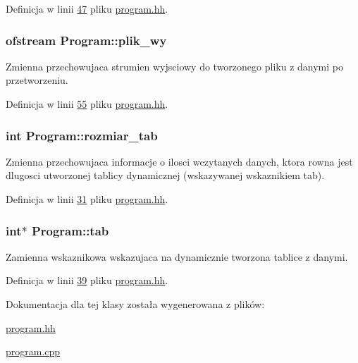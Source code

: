 Definicja w linii \hyperlink{program_8hh_source_l00047}{47} pliku \hyperlink{program_8hh_source}{program.\-hh}.

\hypertarget{class_program_a59c1761a5ea875b3d5a4678928f3a1de}{
\subsubsection[{plik\-\_\-wy}]{\setlength{\rightskip}{0pt plus 5cm}ofstream Program\-::plik\-\_\-wy\hspace{0.3cm}{\ttfamily [protected]}}}\label{class_program_a59c1761a5ea875b3d5a4678928f3a1de}
Zmienna przechowujaca strumien wyjsciowy do tworzonego pliku z danymi po przetworzeniu. 

Definicja w linii \hyperlink{program_8hh_source_l00055}{55} pliku \hyperlink{program_8hh_source}{program.\-hh}.

\hypertarget{class_program_a3b5a10104019b9daa23ce4a5f5533820}{
\subsubsection[{rozmiar\-\_\-tab}]{\setlength{\rightskip}{0pt plus 5cm}int Program\-::rozmiar\-\_\-tab\hspace{0.3cm}{\ttfamily [protected]}}}\label{class_program_a3b5a10104019b9daa23ce4a5f5533820}
Zmienna przechowujaca informacje o ilosci wczytanych danych, ktora rowna jest dlugosci utworzonej tablicy dynamicznej (wskazywanej wskaznikiem tab). 

Definicja w linii \hyperlink{program_8hh_source_l00031}{31} pliku \hyperlink{program_8hh_source}{program.\-hh}.

\hypertarget{class_program_ac72268c925315098b1632cc97d0f818a}{
\subsubsection[{tab}]{\setlength{\rightskip}{0pt plus 5cm}int$\ast$ Program\-::tab\hspace{0.3cm}{\ttfamily [protected]}}}\label{class_program_ac72268c925315098b1632cc97d0f818a}
Zamienna wskaznikowa wskazujaca na dynamicznie tworzona tablice z danymi. 

Definicja w linii \hyperlink{program_8hh_source_l00039}{39} pliku \hyperlink{program_8hh_source}{program.\-hh}.



Dokumentacja dla tej klasy została wygenerowana z plików\-:\begin{DoxyCompactItemize}
\item 
\hyperlink{program_8hh}{program.\-hh}\item 
\hyperlink{program_8cpp}{program.\-cpp}\end{DoxyCompactItemize}
